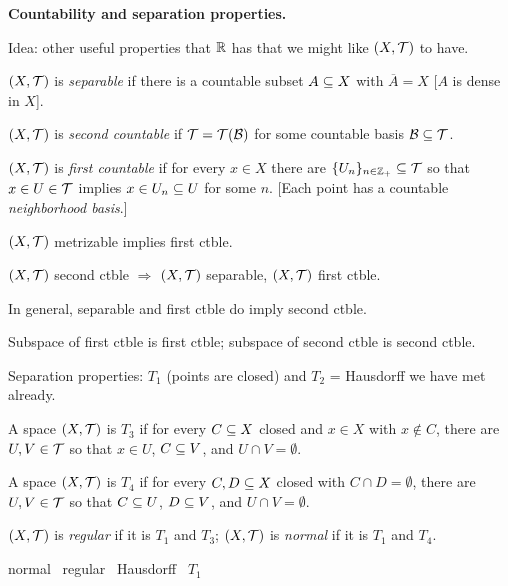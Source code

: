 \documentclass[12pt]{article}
\begin{document}
\msk

{\bf Countability and separation properties.}

\ssk

Idea: other useful properties that ${\mathbb R}$ has that we might like $(X,{\mathcal T})$ to have.

\ssk

$(X,{\mathcal T})$ is {\it separable} if there is a countable subset $A\subseteq X$ with $\overline{A}=X$ [$A$ is dense in $X$].

\ssk

$(X,{\mathcal T})$ is {\it second countable} if ${\mathcal T}={\mathcal T}({\mathcal B})$ for some countable basis ${\mathcal B}\subseteq{\mathcal T}$.

\ssk

$(X,{\mathcal T})$ is {\it first countable} if for every $x\in X$ there are $\{U_n\}_{n\in {\mathbb Z}_+}\subseteq{\mathcal T}$
so that $x\in U\in{\mathcal T}$ implies $x\in U_n\subseteq U$ for some $n$. [Each point has a countable 
{\it neighborhood basis}.]

\ssk

$(X,{\mathcal T})$ metrizable implies first ctble.

\ssk

$(X,{\mathcal T})$ second ctble $\Rightarrow$ $(X,{\mathcal T})$ separable, $(X,{\mathcal T})$ first ctble.

\ssk

In general, separable and first ctble do  imply second ctble.

\ssk

Subspace of first ctble is first ctble; subspace of second ctble is second ctble.

\msk

Separation properties: $T_1$ (points are closed) and $T_2$ = Hausdorff we have met already.

\ssk

A space $(X,{\mathcal T})$ is $T_3$ if for every $C\subseteq X$ closed and $x\in X$ with $x\not\in C$, there are 
$U,V\in{\mathcal T}$ so that $x\in U$, $C\subseteq V$, and $U\cap V=\emptyset$.

\ssk

A space $(X,{\mathcal T})$ is $T_4$ if for every $C,D\subseteq X$ closed with $C\cap D=\emptyset$, there are 
$U,V\in{\mathcal T}$ so that $C\subseteq U$, $D\subseteq V$, and $U\cap V=\emptyset$.

\ssk

$(X,{\mathcal T})$ is {\it regular} if it is $T_1$ and $T_3$; $(X,{\mathcal T})$ is {\it normal} if it
is $T_1$ and $T_4$.

\ssk

normal \rta\ regular \rta\ Hausdorff \rta\ $T_1$
\end{document}
